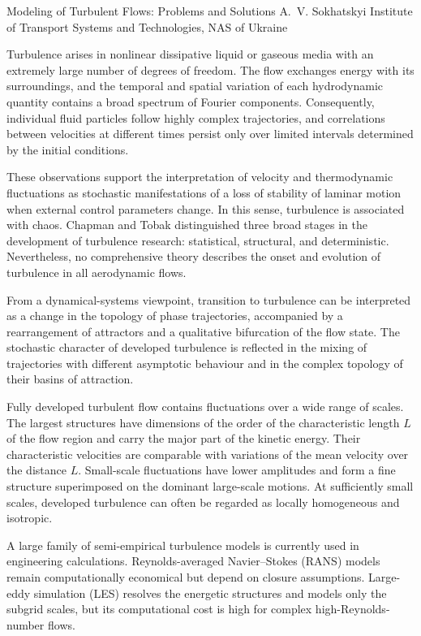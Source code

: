 \ReportHeading
  {Modeling of Turbulent Flows: Problems and Solutions}
  {A.~V. Sokhatskyi}
  {Institute of Transport Systems and Technologies, NAS of Ukraine}
  {}

Turbulence arises in nonlinear dissipative liquid or gaseous media with an extremely large number of degrees of freedom. The flow exchanges energy with its surroundings, and the temporal and spatial variation of each hydrodynamic quantity contains a broad spectrum of Fourier components. Consequently, individual fluid particles follow highly complex trajectories, and correlations between velocities at different times persist only over limited intervals determined by the initial conditions.

These observations support the interpretation of velocity and thermodynamic fluctuations as stochastic manifestations of a loss of stability of laminar motion when external control parameters change. In this sense, turbulence is associated with chaos. Chapman and Tobak distinguished three broad stages in the development of turbulence research: statistical, structural, and deterministic. Nevertheless, no comprehensive theory describes the onset and evolution of turbulence in all aerodynamic flows.

From a dynamical-systems viewpoint, transition to turbulence can be interpreted as a change in the topology of phase trajectories, accompanied by a rearrangement of attractors and a qualitative bifurcation of the flow state. The stochastic character of developed turbulence is reflected in the mixing of trajectories with different asymptotic behaviour and in the complex topology of their basins of attraction.

Fully developed turbulent flow contains fluctuations over a wide range of scales. The largest structures have dimensions of the order of the characteristic length $L$ of the flow region and carry the major part of the kinetic energy. Their characteristic velocities are comparable with variations of the mean velocity over the distance $L$. Small-scale fluctuations have lower amplitudes and form a fine structure superimposed on the dominant large-scale motions. At sufficiently small scales, developed turbulence can often be regarded as locally homogeneous and isotropic.

A large family of semi-empirical turbulence models is currently used in engineering calculations. Reynolds-averaged Navier--Stokes (RANS) models remain computationally economical but depend on closure assumptions. Large-eddy simulation (LES) resolves the energetic structures and models only the subgrid scales, but its computational cost is high for complex high-Reynolds-number flows.

